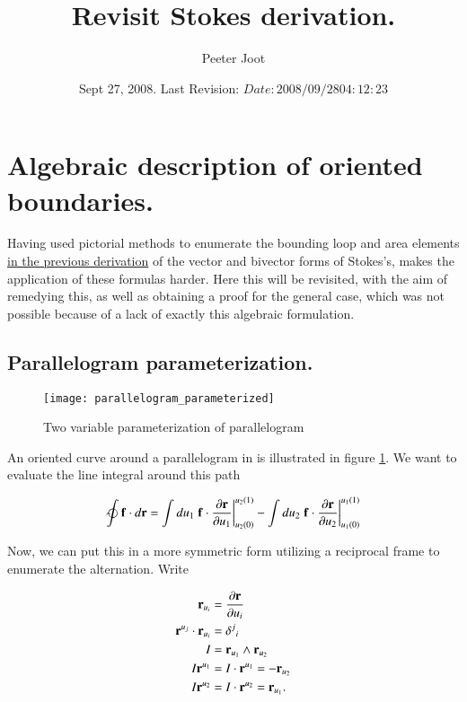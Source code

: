 \documentclass{article}
\title{ Revisit Stokes derivation. }
\author{Peeter Joot}
\date{ Sept 27, 2008.  Last Revision: $Date: 2008/09/28 04:12:23 $ }
\newcommand{\PD}[2]{\frac{\partial {#2}}{\partial {#1}}}
\begin{document}
\maketitle{}

\tableofcontents

\section{ Algebraic description of oriented boundaries. }

Having used pictorial methods to enumerate the bounding loop and area elements 
\href{http://www.geocities.com/peeter_joot/geometric_algebra/vector_integral_relations.pdf}{
in the previous derivation} of the vector and bivector forms of Stokes's, makes the application
of these formulas harder.  Here this will be revisited, with the aim of remedying this, as well as
obtaining a proof for the general case, which was not possible because of a lack of exactly this
algebraic formulation.

\subsection{ Parallelogram parameterization. }

\begin{figure}[htp]
\centering
\texttt{[image: parallelogram\_parameterized]}
\caption{Two variable parameterization of  parallelogram}\label{fig:parallelogram}
\end{figure}

An oriented curve around a parallelogram in  is illustrated in figure 
\ref{fig:parallelogram}.  We want to evaluate the line integral around this
path

\begin{align}\label{eqn:lineprep}
\ointclockwise \Bf \cdot d\Br
&=
\int du_1 \left.{\Bf \cdot \PD{u_1}{\Br} }\right\vert_{u_2(0)}^{u_2(1)}
-\int du_2 \left.{\Bf \cdot \PD{u_2}{\Br} }\right\vert_{u_1(0)}^{u_1(1)} \\
\end{align}

Now, we can put this in a more symmetric form utilizing a reciprocal 
frame to enumerate the alternation.  Write

\begin{align*}
\Br_{u_i} &= \PD{u_i}{\Br} \\
\Br^{u_j} \cdot \Br_{u_i} &= {\delta^j}_i \\
I &= \Br_{u_1} \wedge \Br_{u_2} \\
I \Br^{u_1} &=
I \cdot \Br^{u_1} =
- \Br_{u_2} \\
I \Br^{u_2} &=
I \cdot \Br^{u_2} =
 \Br_{u_1}.
\end{align*}
\end{document}
